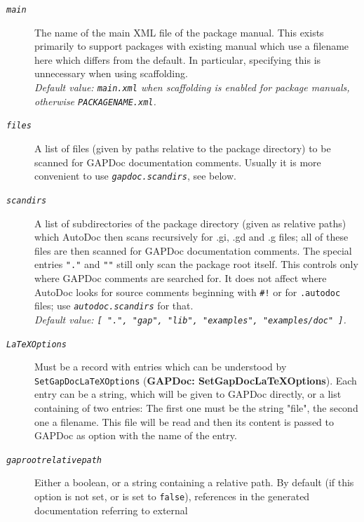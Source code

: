 \documentclass[a4paper,11pt]{report}
\begin{document}
{{{\begin{description}
\begin{description}
 
\begin{description}
\item[{\mbox{\texttt{\mdseries\slshape main}}}]  The name of the main XML file of the package manual. This exists primarily to
support packages with existing manual which use a filename here which differs
from the default. In particular, specifying this is unnecessary when using
scaffolding. \\
 \emph{Default value: \texttt{{\textunderscore}main.xml} when scaffolding is enabled for package manuals, otherwise \texttt{PACKAGENAME.xml}.} 
\item[{\mbox{\texttt{\mdseries\slshape files}}}]  A list of files (given by paths relative to the package directory) to be
scanned for \textsf{GAPDoc} documentation comments. Usually it is more convenient to use \mbox{\texttt{\mdseries\slshape gapdoc.scan{\textunderscore}dirs}}, see below. 
\item[{\mbox{\texttt{\mdseries\slshape scan{\textunderscore}dirs}}}]  A list of subdirectories of the package directory (given as relative paths)
which \textsf{AutoDoc} then scans recursively for .gi, .gd and .g files; all of these files are then
scanned for \textsf{GAPDoc} documentation comments. The special entries \texttt{"."} and \texttt{""} still only scan the package root itself. This controls only where \textsf{GAPDoc} comments are searched for. It does not affect where \textsf{AutoDoc} looks for source comments beginning with \texttt{\#!} or for \texttt{.autodoc} files; use \mbox{\texttt{\mdseries\slshape autodoc.scan{\textunderscore}dirs}} for that. \\
 \emph{Default value: \texttt{[ ".", "gap", "lib", "examples", "examples/doc" ]}.} 
\item[{\mbox{\texttt{\mdseries\slshape LaTeXOptions}}}]  Must be a record with entries which can be understood by \texttt{SetGapDocLaTeXOptions} (\textbf{GAPDoc: SetGapDocLaTeXOptions}). Each entry can be a string, which will be given to \textsf{GAPDoc} directly, or a list containing of two entries: The first one must be the
string "file", the second one a filename. This file will be read and then its
content is passed to \textsf{GAPDoc} as option with the name of the entry. 
\item[{\mbox{\texttt{\mdseries\slshape gap{\textunderscore}root{\textunderscore}relative{\textunderscore}path}}}]  Either a boolean, or a string containing a relative path. By default (if this
option is not set, or is set to \texttt{false}), references in the generated documentation referring to external

\end{description}
\end{description}
\end{description}}}}
\end{document}
